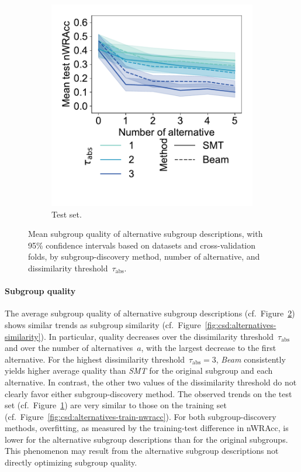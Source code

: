 \documentclass{article}
\theoremstyle{definition}
\begin{document}
\begin{figure}[t]
\begin{subfigure}[t]{0.48\textwidth}
		\includegraphics[width=\textwidth, trim=15 50 15 15, clip]{plots/csd-alternatives-test-nwracc.pdf}
		\caption{Test set.}
		\label{fig:csd:alternatives-test-nwracc}
	\end{subfigure}
	\caption{
		Mean subgroup quality of alternative subgroup descriptions, with 95\% confidence intervals based on datasets and cross-validation folds, by subgroup-discovery method, number of alternative, and dissimilarity threshold~$\tau_{\text{abs}}$.
	}
	\label{fig:csd:alternatives-nwracc}
\end{figure}

\paragraph{Subgroup quality}

The average subgroup quality of alternative subgroup descriptions (cf.~Figure~\ref{fig:csd:alternatives-nwracc}) shows similar trends as subgroup similarity (cf.~Figure~\ref{fig:csd:alternatives-similarity}).
In particular, quality decreases over the dissimilarity threshold~$\tau_{\text{abs}}$ and over the number of alternatives~$a$, with the largest decrease to the first alternative.
For the highest dissimilarity threshold~$\tau_{\text{abs}} = 3$, \emph{Beam} consistently yields higher average quality than \emph{SMT} for the original subgroup and each alternative.
In contrast, the other two values of the dissimilarity threshold do not clearly favor either subgroup-discovery method.
The observed trends on the test set (cf.~Figure~\ref{fig:csd:alternatives-test-nwracc}) are very similar to those on the training set (cf.~Figure~\ref{fig:csd:alternatives-train-nwracc}).
For both subgroup-discovery methods, overfitting, as measured by the training-test difference in nWRAcc, is lower for the alternative subgroup descriptions than for the original subgroups.
This phenomenon may result from the alternative subgroup descriptions not directly optimizing subgroup quality.
\end{document}
